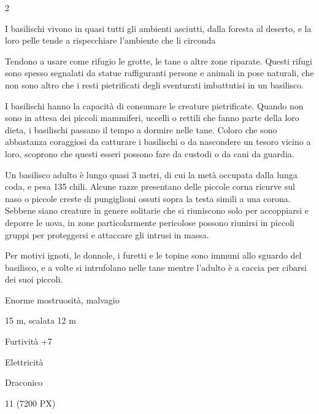 \begin{multicols}{2}
{I basilischi vivono in quasi tutti gli ambienti asciutti, dalla foresta al deserto, e la loro pelle tende a rispecchiare l'ambiente che li circonda

Tendono a usare come rifugio le grotte, le tane o altre zone riparate. Questi rifugi sono spesso segnalati da statue raffiguranti persone e animali in pose naturali, che non sono altro che i resti pietrificati degli sventurati imbattutisi in un basilisco.

I basilischi hanno la capacità di consumare le creature pietrificate. Quando non sono in attesa dei piccoli mammiferi, uccelli o rettili che fanno parte della loro dieta, i basilischi passano il tempo a dormire nelle tane. Coloro che sono abbastanza coraggiosi da catturare i basilischi o da nascondere un tesoro vicino a loro, scoprono che questi esseri possono fare da custodi o da cani da guardia.

Un basilisco adulto è lungo quasi 3 metri, di cui la metà occupata dalla lunga coda, e pesa 135 chili. Alcune razze presentano delle piccole corna ricurve sul naso o piccole creste di pungiglioni ossuti sopra la testa simili a una corona. Sebbene siano creature in genere solitarie che si riuniscono solo per accoppiarsi e deporre le uova, in zone particolarmente pericolose possono riunirsi in piccoli gruppi per proteggersi e attaccare gli intrusi in massa.

Per motivi ignoti, le donnole, i furetti e le topine sono immuni allo sguardo del basilisco, e a volte si intrufolano nelle tane mentre l'adulto è a caccia per cibarsi dei suoi piccoli.


\begin{description}[noitemsep, topsep=0pt, parsep=0pt, partopsep=0pt, itemsep=1pt, leftmargin=2.35cm,  labelwidth=2.2cm, itemindent=0cm, listparindent=0pt] %
\setlength{\baselineskip}{10pt}
\item[\textbf{Taglia/Tipo}] Enorme mostruosità, malvagio
\item[\textbf{Caratt.}] 
\item[\textbf{Punti Ferita}] 
\item[\textbf{Movimento}] 15 m, scalata 12 m
\item[\textbf{Tiri Salvez.}] 
\item[\textbf{Comp.}] Furtività +7
\item[\textbf{Imm. Danni}] Elettricità
\item[\textbf{Sensi}] 
\item[\textbf{Linguaggi}] Draconico
\item[\textbf{Sfida}] 11 (7200 PX)
\end{description}
\smallskip

}
\end{multicols}
